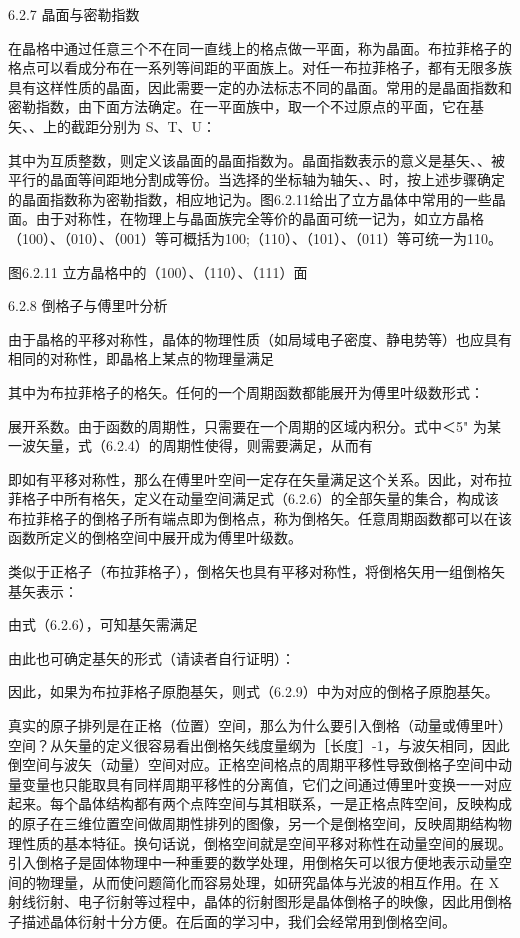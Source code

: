 6.2.7 晶面与密勒指数

在晶格中通过任意三个不在同一直线上的格点做一平面，称为晶面。布拉菲格子的格点可以看成分布在一系列等间距的平面族上。对任一布拉菲格子，都有无限多族具有这样性质的晶面，因此需要一定的办法标志不同的晶面。常用的是晶面指数和密勒指数，由下面方法确定。在一平面族中，取一个不过原点的平面，它在基矢、、上的截距分别为 S、T、U：



其中为互质整数，则定义该晶面的晶面指数为。晶面指数表示的意义是基矢、、被平行的晶面等间距地分割成等份。当选择的坐标轴为轴矢、、时，按上述步骤确定的晶面指数称为密勒指数，相应地记为。图6.2.11给出了立方晶体中常用的一些晶面。由于对称性，在物理上与晶面族完全等价的晶面可统一记为，如立方晶格（100）、（010）、（001）等可概括为{100};（110）、（101）、（011）等可统一为{110}。



图6.2.11 立方晶格中的（100）、（110）、（111）面

6.2.8 倒格子与傅里叶分析

由于晶格的平移对称性，晶体的物理性质（如局域电子密度、静电势等）也应具有相同的对称性，即晶格上某点的物理量满足



其中为布拉菲格子的格矢。任何的一个周期函数都能展开为傅里叶级数形式：



展开系数。由于函数的周期性，只需要在一个周期的区域内积分。式中＜5" 为某一波矢量，式（6.2.4）的周期性使得，则需要满足，从而有



即如有平移对称性，那么在傅里叶空间一定存在矢量满足这个关系。因此，对布拉菲格子中所有格矢，定义在动量空间满足式（6.2.6）的全部矢量的集合，构成该布拉菲格子的倒格子所有端点即为倒格点，称为倒格矢。任意周期函数都可以在该函数所定义的倒格空间中展开成为傅里叶级数。

类似于正格子（布拉菲格子），倒格矢也具有平移对称性，将倒格矢用一组倒格矢基矢表示：



由式（6.2.6），可知基矢需满足



由此也可确定基矢的形式（请读者自行证明）：







因此，如果为布拉菲格子原胞基矢，则式（6.2.9）中为对应的倒格子原胞基矢。

真实的原子排列是在正格（位置）空间，那么为什么要引入倒格（动量或傅里叶）空间？从矢量的定义很容易看出倒格矢线度量纲为［长度］-1，与波矢相同，因此倒空间与波矢（动量）空间对应。正格空间格点的周期平移性导致倒格子空间中动量变量也只能取具有同样周期平移性的分离值，它们之间通过傅里叶变换一一对应起来。每个晶体结构都有两个点阵空间与其相联系，一是正格点阵空间，反映构成的原子在三维位置空间做周期性排列的图像，另一个是倒格空间，反映周期结构物理性质的基本特征。换句话说，倒格空间就是空间平移对称性在动量空间的展现。引入倒格子是固体物理中一种重要的数学处理，用倒格矢可以很方便地表示动量空间的物理量，从而使问题简化而容易处理，如研究晶体与光波的相互作用。在 X 射线衍射、电子衍射等过程中，晶体的衍射图形是晶体倒格子的映像，因此用倒格子描述晶体衍射十分方便。在后面的学习中，我们会经常用到倒格空间。

